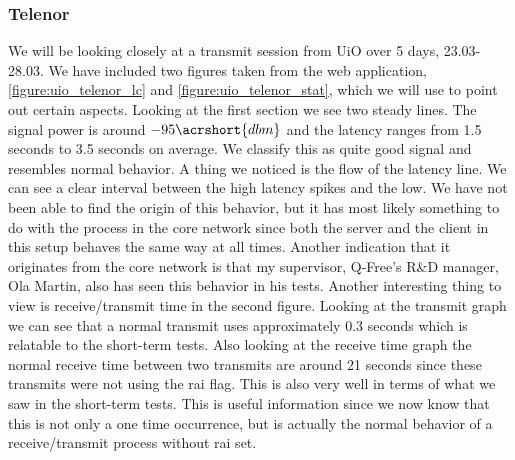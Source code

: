 \documentclass[USenglish]{ifimaster}  %
\begin{document}
\subsubsection{Telenor}
We will be looking closely at a transmit session from UiO over 5 days, 23.03-28.03. We have included two figures taken from the web application, \vref{figure:uio_telenor_lc} and \vref{figure:uio_telenor_stat}, which we will use to point out certain aspects. Looking at the first section we see two steady lines. The signal power is around ${-95 \acrshort{dbm}}$ and the latency ranges from 1.5 seconds to 3.5 seconds on average. We classify this as quite good signal and resembles normal behavior. A thing we noticed is the flow of the latency line. We can see a clear interval between the high latency spikes and the low. We have not been able to find the origin of this behavior, but it has most likely something to do with the process in the core network since both the server and the client in this setup behaves the same way at all times. Another indication that it originates from the core network is that my supervisor, Q-Free's R\&D manager, Ola Martin, also has seen this behavior in his tests\cite{person:ola}. Another interesting thing to view is receive/transmit time in the second figure. Looking at the transmit graph we can see that a normal transmit uses approximately 0.3 seconds which is relatable to the short-term tests. Also looking at the receive time graph the normal receive time between two transmits are around 21 seconds since these transmits were not using the \acrshort{rai} flag. This is also very well in terms of what we saw in the short-term tests. This is useful information since we now know that this is not only a one time occurrence, but is actually the normal behavior of a receive/transmit process without \acrshort{rai} set.
\end{document}
